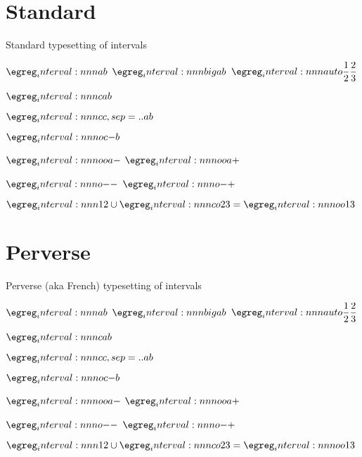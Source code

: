 \documentclass{article}
\begin{document}
\section*{Standard}
Standard typesetting of intervals

$\interval{a,b}$\quad
$\interval[big]{a,b}$\quad
$\interval[auto]{\dfrac{1}{2},\dfrac{2}{3}}$

$\interval[c]{a,b}$

$\interval[cc,sep=..]{a,b}$

$\interval[oc]{-,b}$

$\interval[oo]{a,-}$\qquad
$\interval[oo]{a,+}$

$\interval[o]{-,-}$\qquad
$\interval[o]{-,+}$

$\interval{1,2}\cup\interval[co]{2,3}=\interval[oo]{1,3}$

\section*{Perverse}
Perverse (aka French) typesetting of intervals


$\interval{a,b}$\quad
$\interval[big]{a,b}$\quad
$\interval[auto]{\dfrac{1}{2},\dfrac{2}{3}}$

$\interval[c]{a,b}$

$\interval[cc,sep=..]{a,b}$

$\interval[oc]{-,b}$

$\interval[oo]{a,-}$\qquad
$\interval[oo]{a,+}$

$\interval[o]{-,-}$\qquad
$\interval[o]{-,+}$

$\interval{1,2}\cup\interval[co]{2,3}=\interval[oo]{1,3}$
\end{document}
